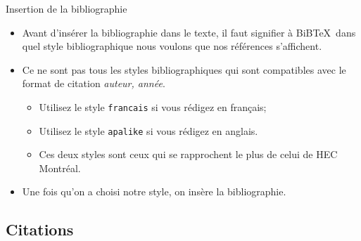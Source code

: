 \begin{frame}[fragile]{Insertion de la bibliographie}
	\begin{itemize}
		\item Avant d'insérer la bibliographie dans le texte, il faut signifier à BiB\TeX\ dans quel
		style bibliographique nous voulons que nos références s'affichent.
\begin{codesource}
	
\end{codesource}
		
		\pause
		
		\item Ce ne sont pas tous les styles bibliographiques qui sont compatibles avec le format de 
			citation \emph{auteur, année}.
			\begin{itemize}
				\scriptsize
				\item Utilisez le style \texttt{francais} si vous rédigez en français;
				\item Utilisez le style \texttt{apalike} si vous rédigez en anglais.
\begin{codesource}
	
	
	
\end{codesource}
				\item Ces deux styles sont ceux qui se rapprochent le plus de celui de HEC Montréal.
			\end{itemize}
		
		\pause
		
		\item Une fois qu'on a choisi notre style, on insère la bibliographie.
\begin{codesource}
	
\end{codesource}
	\end{itemize}
\end{frame}

\subsection{Citations}

